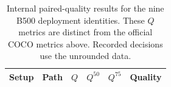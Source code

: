 \begin{table}[htbp]
\centering\small\TableSetup
\caption{Internal paired-quality results for the nine B500 deployment identities. These $Q$ metrics are distinct from the official COCO metrics above. Recorded decisions use the unrounded data.}
\label{tab:evaluation:yolov7_standard_quality}
\begin{tabularx}{\linewidth}{@{}L{1.55cm}Y S[table-format=1.3] S[table-format=1.3] S[table-format=1.3]l@{}}
\toprule
\textbf{Setup} & \textbf{Path} & {$Q$} & {$Q^{50}$} & {$Q^{75}$} & \textbf{Quality} \\
\midrule
\bottomrule
\end{tabularx}
\end{table}
